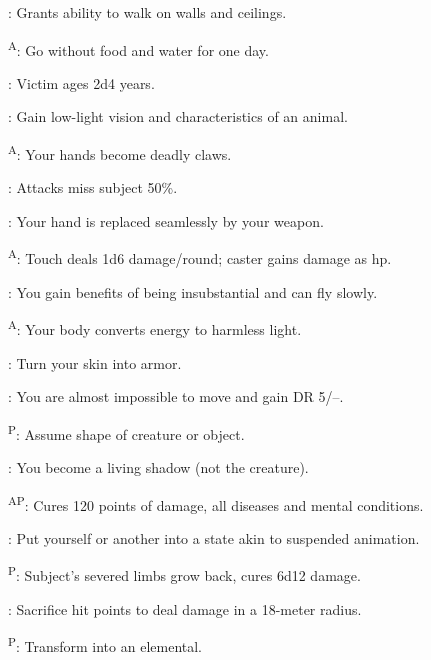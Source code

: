 \begin{enumerate*}
      : Grants ability to walk on walls and ceilings.

      \textsuperscript{A}: Go without food and water for one day. %

\item {}: Victim ages 2d4 years.

      : Gain low-light vision and characteristics of an animal.

      \textsuperscript{A}: Your hands become deadly claws. %

      : Attacks miss subject 50\%.

      : Your hand is replaced seamlessly by your weapon. %

      \textsuperscript{A}: Touch deals 1d6 damage/round; caster gains damage as hp.

\item {}: You gain benefits of being insubstantial and can fly slowly. %

      \textsuperscript{A}: Your body converts energy to harmless light.

      : Turn your skin into armor.

\item {}: You are almost impossible to move and gain DR 5/--.

      \textsuperscript{P}: Assume shape of creature or object. %

      : You become a living shadow (not the creature). %

\item {}\textsuperscript{AP}: Cures 120 points of damage, all diseases and mental conditions.

      : Put yourself or another into a state akin to suspended animation. %

\item {}\textsuperscript{P}: Subject's severed limbs grow back, cures 6d12 damage.

\item {}: Sacrifice hit points to deal damage in a 18-meter radius.

\item {}\textsuperscript{P}: Transform into an elemental.
\end{enumerate*}



